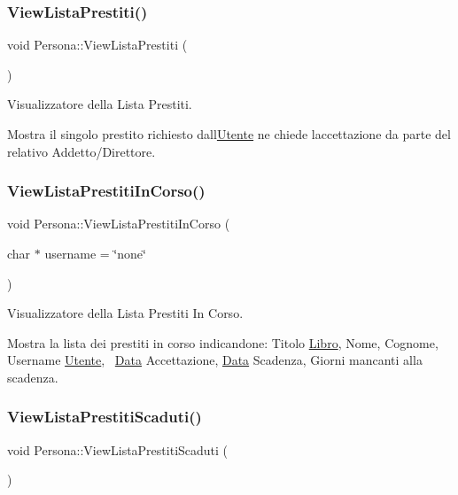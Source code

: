 \subsubsection{\texorpdfstring{View\+Lista\+Prestiti()}{ViewListaPrestiti()}}
{\footnotesize\ttfamily void Persona\+::\+View\+Lista\+Prestiti (\begin{DoxyParamCaption}{ }\end{DoxyParamCaption})}



Visualizzatore della Lista Prestiti. 

Mostra il singolo prestito richiesto dall\textquotesingle{}\mbox{\hyperlink{class_utente}{Utente}} ne chiede l\textquotesingle{}accettazione da parte del relativo Addetto/\+Direttore. \mbox{\label{class_persona_a8d7f6fa850c62e1eaac15c64013367a9}} 
\subsubsection{\texorpdfstring{View\+Lista\+Prestiti\+In\+Corso()}{ViewListaPrestitiInCorso()}}
{\footnotesize\ttfamily void Persona\+::\+View\+Lista\+Prestiti\+In\+Corso (\begin{DoxyParamCaption}\item[{char $\ast$}]{username = {\ttfamily \char`\"{}none\char`\"{}} }\end{DoxyParamCaption})}



Visualizzatore della Lista Prestiti In Corso. 

Mostra la lista dei prestiti in corso indicandone\+: Titolo \mbox{\hyperlink{class_libro}{Libro}}, Nome, Cognome, Username \mbox{\hyperlink{class_utente}{Utente}},~\newline
\mbox{\hyperlink{class_data}{Data}} Accettazione, \mbox{\hyperlink{class_data}{Data}} Scadenza, Giorni mancanti alla scadenza. \mbox{\label{class_persona_ade5bba69999d1ccedd4104f1c6c323b6}} 
\subsubsection{\texorpdfstring{View\+Lista\+Prestiti\+Scaduti()}{ViewListaPrestitiScaduti()}}
{\footnotesize\ttfamily void Persona\+::\+View\+Lista\+Prestiti\+Scaduti (\begin{DoxyParamCaption}{ }\end{DoxyParamCaption})}




